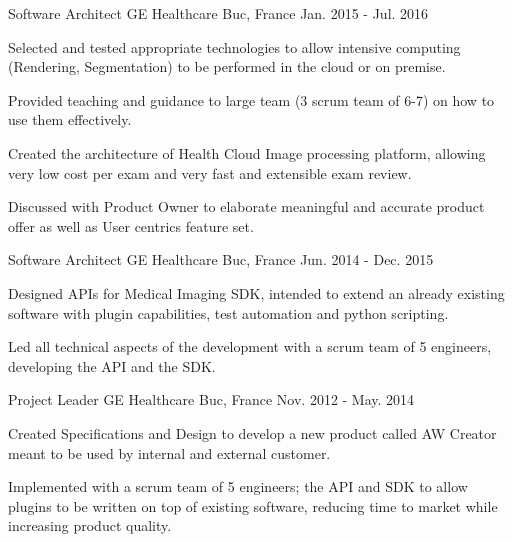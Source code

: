 \begin{cventries}
  \cventry
    {Software Architect} %
    {GE Healthcare} %
    {Buc, France} %
    {Jan. 2015 - Jul. 2016} %
    {
      \begin{cvitems} %
      \item {Selected and tested appropriate technologies to allow intensive computing (Rendering, Segmentation) to be performed in the cloud or on premise.}
        \item {Provided teaching and guidance to large team (3 scrum team of 6-7) on how to use them effectively.}
        \item {Created the architecture of Health Cloud Image processing platform, allowing very low cost per exam and very fast and extensible exam review.}
        \item {Discussed with Product Owner to elaborate meaningful and accurate product offer as well as User centrics feature set.}
      \end{cvitems}
    }

  \cventry
    {Software Architect} %
    {GE Healthcare} %
    {Buc, France} %
    {Jun. 2014 - Dec. 2015} %
    {
      \begin{cvitems} %
        \item {Designed APIs for Medical Imaging SDK, intended to extend an already existing software with plugin capabilities, test automation and python scripting.}
        \item {Led all technical aspects of the development with a scrum team of 5 engineers, developing the API and the SDK.}
      \end{cvitems}
    }

  \cventry
    {Project Leader} %
    {GE Healthcare} %
    {Buc, France} %
    {Nov. 2012 - May. 2014} %
    {
      \begin{cvitems} %
        \item {Created Specifications and Design to develop a new product called AW Creator meant to be used by internal and external customer.}
        \item {Implemented with a scrum team of 5 engineers; the API and SDK to allow plugins to be written on top of existing software, reducing time to market while increasing product quality.}
      \end{cvitems}
    }


\end{cventries}
